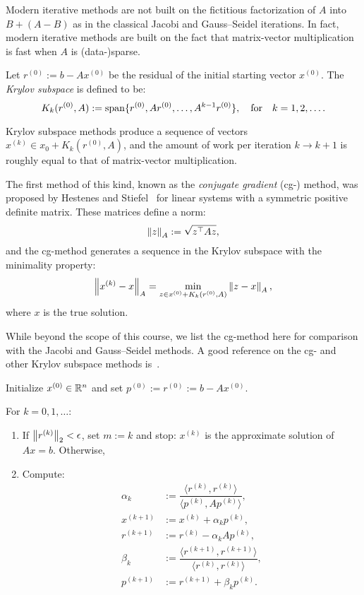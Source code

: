 Modern iterative methods are not built on the fictitious factorization of $A$ into $B + (A-B)$ as in the classical Jacobi and Gauss--Seidel iterations. In fact, modern iterative methods are built on the fact that matrix-vector multiplication is fast when $A$ is (data-)sparse.

\begin{definition}
Let $r^{(0)} := b-Ax^{(0)}$ be the residual of the initial starting vector $x^{(0)}$. The {\em Krylov subspace} is defined to be:
\[
K_k(r^{(0)},A) := \operatorname{span}\{r^{(0)},Ar^{(0)},\ldots, A^{k-1}r^{(0)}\},\quad{\rm for}\quad k=1,2,\ldots.
\]
\end{definition}

Krylov subspace methods produce a sequence of vectors $x^{(k)}\in x_0 + K_k(r^{(0)},A)$, and the amount of work per iteration $k\rightarrow k+1$ is roughly equal to that of matrix-vector multiplication.

The first method of this kind, known as the {\em conjugate gradient} (cg-) method, was proposed by Hestenes and Stiefel~\cite{Hestenes-Stiefel-49-409-52} for linear systems with a symmetric positive definite matrix. These matrices define a norm:
\[
\left\|{z}\right\|_A := \sqrt{z^\top Az},
\]
and the cg-method generates a sequence in the Krylov subspace with the minimality property:
\begin{equation}\label{eq:CGMinimality}
\left\|{x^{(k)}-x}\right\|_A = \min_{z\in x^{(0)}+K_k(r^{(0)},A)} \left\|{z-x}\right\|_A,
\end{equation}
where $x$ is the true solution.

While beyond the scope of this course, we list the cg-method here for comparison with the Jacobi and Gauss--Seidel methods. A good reference on the cg- and other Krylov subspace methods is~\cite[Chap. 8]{Stoer-Bulirsch-02}.

\begin{algorithm}
Initialize $x^{(0)}\in\mathbb{R}^n$ and set $p^{(0)} := r^{(0)} :=b-Ax^{(0)}$.

For $k=0,1,\ldots$:
\begin{enumerate}
\item If $\left\|{r^{(k)}}\right\|_2 < \epsilon$, set $m:=k$ and stop: $x^{(k)}$ is the approximate solution of $Ax=b$. Otherwise,
\item Compute:
\begin{align*}
\alpha_k & := \dfrac{\langle r^{(k)}, r^{(k)}\rangle}{\langle p^{(k)}, Ap^{(k)}\rangle},\\
x^{(k+1)} & := x^{(k)} + \alpha_kp^{(k)},\\
r^{(k+1)} & := r^{(k)} - \alpha_k Ap^{(k)},\\
\beta_k & := \dfrac{\langle r^{(k+1)}, r^{(k+1)}\rangle}{\langle r^{(k)}, r^{(k)}\rangle},\\
p^{(k+1)} & := r^{(k+1)} + \beta_k p^{(k)}.
\end{align*}
\end{enumerate}
\end{algorithm}

